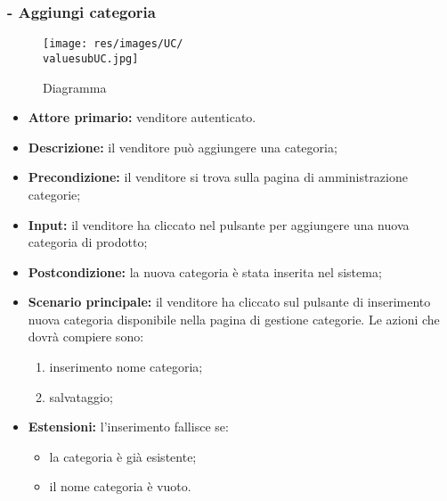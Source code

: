 \subsubsection{- Aggiungi categoria}
\begin{figure}[H]
    \centering
    \texttt{[image: res/images/UC/\\valuesubUC.jpg]}
    \caption{Diagramma }
\end{figure}
\begin{itemize}
    \item \textbf{Attore primario:} venditore autenticato.
    \item \textbf{Descrizione:} il venditore può aggiungere una categoria;
    \item \textbf{Precondizione:} il venditore si trova sulla pagina di amministrazione categorie;
    \item \textbf{Input:} il venditore ha cliccato nel pulsante per aggiungere una nuova categoria di prodotto;
    \item \textbf{Postcondizione:} la nuova categoria è stata inserita nel sistema;
    \item \textbf{Scenario principale:} il venditore ha cliccato sul pulsante di inserimento nuova categoria disponibile nella pagina di gestione categorie. Le azioni che dovrà compiere sono:
          \begin{enumerate}
              \item inserimento nome categoria;
              \item salvataggio;
          \end{enumerate}
    \item \textbf{Estensioni:} l'inserimento fallisce se:
          \begin{itemize}
              \item la categoria è già esistente;
              \item il nome categoria è vuoto.
          \end{itemize}
\end{itemize}

\stepsubUserCase
